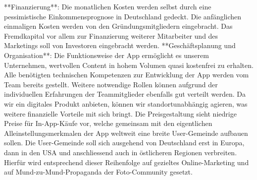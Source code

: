 **Finanzierung**: Die monatlichen Kosten werden selbst durch eine pessimistische Einkommensprognose in Deutschland gedeckt. Die anfänglichen einmaligen Kosten werden von den Gründungsmitgliedern eingebracht. Das Fremdkapital vor allem zur Finanzierung weiterer Mitarbeiter und des Marketings soll von Investoren eingebracht werden.
**Geschäftsplanung und Organisation**: Die Funktionsweise der App ermöglicht es unserem Unternehmen, wertvollen Content in hohem Volumen quasi kostenfrei zu erhalten. Alle benötigten technischen Kompetenzen zur Entwicklung der App werden vom Team bereits gestellt. Weitere notwendige Rollen können aufgrund der individuellen Erfahrungen der Teammitglieder ebenfalls gut verteilt werden. Da wir ein digitales Produkt anbieten, können wir standortunabhängig agieren, was weitere finanzielle Vorteile mit sich bringt.
Die Preisgestaltung sieht niedrige Preise für In-App-Käufe vor, welche gemeinsam mit den eigentlichen Alleinstellungsmerkmalen der App weltweit eine breite User-Gemeinde aufbauen sollen. Die User-Gemeinde soll sich ausgehend von Deutschland erst in Europa, dann in den USA und anschliessend auch in östlicheren Regionen verbreiten. Hierfür wird entsprechend dieser Reihenfolge auf gezieltes Online-Marketing und auf Mund-zu-Mund-Propaganda der Foto-Community gesetzt.
